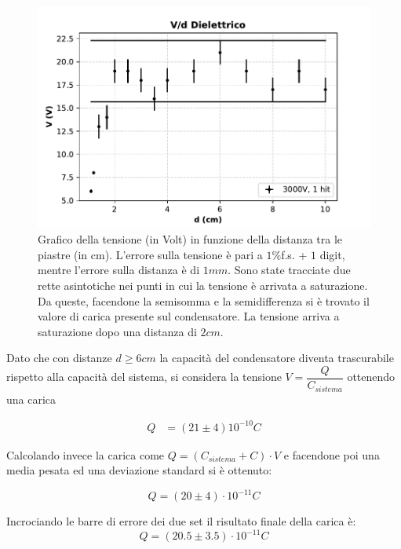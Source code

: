 {\fontsize{12}{14}\selectfont 
\begin{figure}[H]
  \centering
  \includegraphics[width=13cm]{Figures/Grafico_Parte4.pdf}
  \caption{Grafico della tensione (in Volt) in funzione della distanza tra le piastre (in cm). L'errore sulla tensione è pari a $1\% $f.s. + $1$ digit, mentre l'errore sulla distanza è di $1 mm$. Sono state tracciate due rette asintotiche nei punti in cui la tensione è arrivata a saturazione. Da queste, facendone la semisomma e la semidifferenza si è trovato il valore di carica presente sul condensatore. La tensione arriva a saturazione dopo una distanza di $2cm$.}
  \label{fig:parteIV}
\end{figure}

Dato che con distanze $d \geq 6cm$ la capacità del condensatore diventa trascurabile rispetto alla capacità del sistema, si considera la tensione $V = \dfrac{Q}{C_{sistema}}$ ottenendo una carica

\begin{align*}
    Q &= (21 \pm 4) 10^{-10} C
\end{align*}

Calcolando invece la carica come $Q = (C_{sistema} + C) \cdot V$ e facendone poi una media pesata ed una deviazione standard si è ottenuto:

\begin{equation*}
    Q = (20 \pm 4)\cdot 10^{-11} C
\end{equation*}

Incrociando le barre di errore dei due set il risultato finale della carica è:
\begin{equation*}
    Q = (20.5 \pm 3.5)\cdot 10^{-11} C
\end{equation*}



\par}